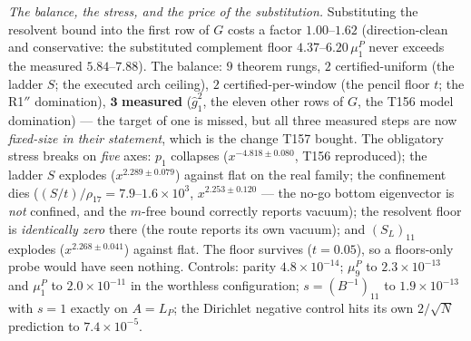 \documentclass[11pt,a4paper]{article}
\begin{document}
\emph{The balance, the stress, and the price of the substitution.} Substituting the
resolvent bound into the first row of $G$ costs a factor $1.00$--$1.62$
(direction-clean and conservative: the substituted complement floor
$4.37$--$6.20\,\mu^P_1$ never exceeds the measured $5.84$--$7.88$). The balance: $9$
theorem rungs, $2$ certified-uniform (the ladder $S$; the executed arch ceiling), $2$
certified-per-window (the pencil floor $t$; the R1$''$ domination), $\mathbf 3$
\textbf{measured} ($\hat g_1^2$, the eleven other rows of $G$, the T156 model
domination) --- the target of one is missed, but all three measured steps are now
\emph{fixed-size in their statement}, which is the change T157 bought. The obligatory
stress breaks on \emph{five} axes: $p_1$ collapses ($x^{-4.818\pm0.080}$, T156
reproduced); the ladder $S$ explodes ($x^{2.289\pm0.079}$) against flat on the real
family; the confinement dies ($(S/t)/\rho_{17}=7.9$--$1.6\times10^{3}$,
$x^{2.253\pm0.120}$ --- the no-go bottom eigenvector is \emph{not} confined, and the
$m$-free bound correctly reports vacuum); the resolvent floor is \emph{identically
zero} there (the route reports its own vacuum); and $(S_L)_{11}$ explodes
($x^{2.268\pm0.041}$) against flat. The floor survives ($t=0.05$), so a floors-only
probe would have seen nothing. Controls: parity $4.8\times10^{-14}$; $\mu^P_9$ to
$2.3\times10^{-13}$ and $\mu^P_1$ to $2.0\times10^{-11}$ in the worthless configuration;
$s=(B^{-1})_{11}$ to $1.9\times10^{-13}$ with $s=1$ exactly on $A=L_P$; the Dirichlet
negative control hits its own $2/\sqrt N$ prediction to $7.4\times10^{-5}$.
\end{document}
